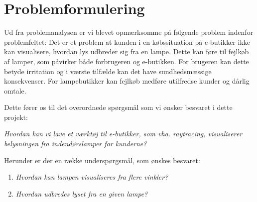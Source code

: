 \section{Problemformulering}

Ud fra problemanalysen er vi blevet opmærksomme på følgende problem indenfor problemfeltet:
Det er et problem at kunden i en købssituation på e-butikker ikke kan visualisere, hvordan lys udbreder sig fra en lampe. Dette kan føre til fejlkøb af lamper, som påvirker både forbrugeren og e-butikken. For brugeren kan dette betyde irritation og i værste tilfælde kan det have sundhedsmæssige konsekvenser. For lampebutikker kan fejlkøb medføre utilfredse kunder og dårlig omtale. 

Dette fører os til det overordnede spørgsmål som vi ønsker besvaret i dette projekt:

\textit{Hvordan kan vi lave et værktøj til e-butikker, som vha. raytracing, visualiserer belysningen fra indendørslamper for kunderne?}

Herunder er der en række underspørgsmål, som ønskes besvaret:

\begin{enumerate}

\item \textit{Hvordan kan lampen visualiseres fra flere vinkler?}
\item \textit{Hvordan udbredes lyset fra en given lampe?}

\end{enumerate}